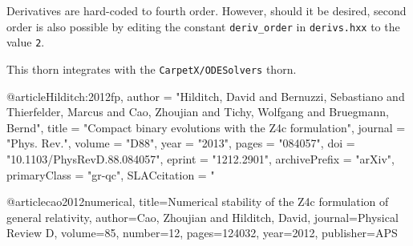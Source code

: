 Derivatives are hard-coded to fourth order. However, should it be desired, second order is also possible by editing the constant \texttt{deriv\_order} in \texttt{derivs.hxx} to the value \texttt{2}.

This thorn integrates with the \texttt{CarpetX/ODESolvers} thorn.

\begin{thebibliography}{9}
@article{Hilditch:2012fp,
      author         = "Hilditch, David and Bernuzzi, Sebastiano and Thierfelder,
                        Marcus and Cao, Zhoujian and Tichy, Wolfgang and
                        Bruegmann, Bernd",
      title          = "{Compact binary evolutions with the Z4c formulation}",
      journal        = "Phys. Rev.",
      volume         = "D88",
      year           = "2013",
      pages          = "084057",
      doi            = "10.1103/PhysRevD.88.084057",
      eprint         = "1212.2901",
      archivePrefix  = "arXiv",
      primaryClass   = "gr-qc",
      SLACcitation   = "%
}

@article{cao2012numerical,
  title={Numerical stability of the Z4c formulation of general relativity},
  author={Cao, Zhoujian and Hilditch, David},
  journal={Physical Review D},
  volume={85},
  number={12},
  pages={124032},
  year={2012},
  publisher={APS}
}

\end{thebibliography}



